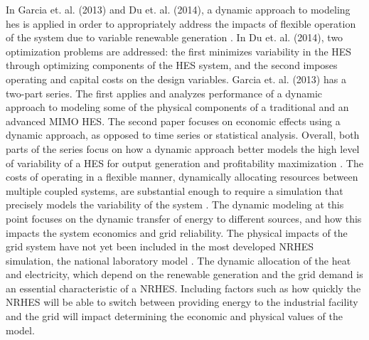 In Garcia et. al. (2013) and Du et. al. (2014), a dynamic approach to modeling \ac{hes} is applied in order to appropriately address the impacts of flexible operation of the system due to variable renewable generation \cite{Garcia2013, Du2014}. In Du et. al. (2014), two optimization problems are addressed: the first minimizes variability in the HES through optimizing components of the HES system, and the second imposes operating and capital costs on the design variables. Garcia et. al. (2013) has a two-part series. The first applies and analyzes performance of a dynamic approach to modeling some of the physical components of a traditional and an advanced MIMO HES. The second paper focuses on economic effects using a dynamic approach, as opposed to time series or statistical analysis. Overall, both parts of the series focus on how a dynamic approach better models the high level of variability of a HES for output generation and profitability maximization \cite{Garcia2013}. The costs of operating in a flexible manner, dynamically allocating resources between multiple coupled systems, are substantial enough to require a simulation that precisely models the variability of the system \cite{Garcia2013, Shropshire2011, Locatelli2015}. The dynamic modeling at this point focuses on the dynamic transfer of energy to different sources, and how this impacts the system economics and grid reliability. The physical impacts of the grid system have not yet been included in the most developed NRHES simulation, the national laboratory model \cite{Harrison2016}.  The dynamic allocation of the heat and electricity, which depend on the renewable generation and the grid demand is an essential characteristic of a NRHES.  Including factors such as how quickly the NRHES will be able to switch between providing energy to the industrial facility and the grid will impact determining the economic and physical values of the model.

